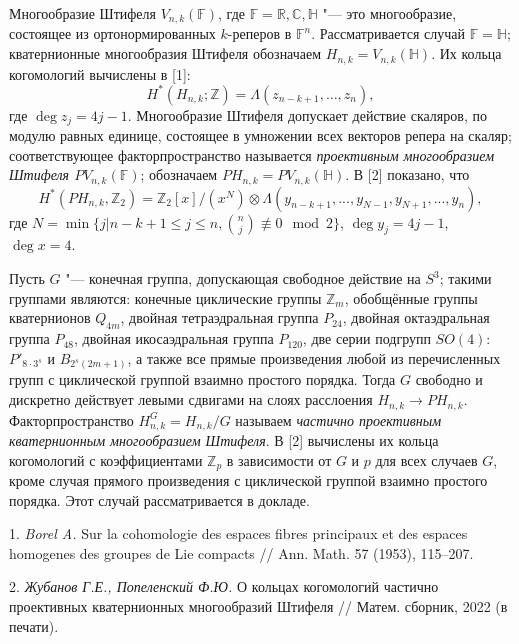 
\vzmscaption

Многообразие Штифеля $V_{n,k}(\mathbb{F})$, где $\mathbb{F} = \mathbb{R}, \mathbb{C}, \mathbb{H}$ "--- это многообразие, состоящее из ортонормированных $k$-реперов в $\mathbb{F}^n$. Рассматривается случай $\mathbb{F} = \mathbb{H}$; кватернионные многообразия Штифеля обозначаем $H_{n,k} = V_{n,k}(\mathbb{H})$. Их кольца когомологий вычислены в [1]:
$$H^*(H_{n,k}; \mathbb{Z}) = \Lambda(z_{n-k+1}, \ldots, z_n),$$
где $\deg z_j = 4j - 1$. Многообразие Штифеля допускает действие скаляров, по модулю равных единице, состоящее в умножении всех векторов репера на скаляр; соответствующее факторпространство называется \emph{проективным многообразием Штифеля $PV_{n,k}(\mathbb{F})$}; обозначаем $PH_{n,k}=PV_{n,k}(\mathbb{H})$. В [2] показано, что
$$H^*(PH_{n,k}, \mathbb{Z}_2) = \mathbb{Z}_2[x]/(x^N) \otimes \Lambda(y_{n-k+1},..., y_{N-1}, y_{N+1}, ..., y_n),$$
где $N = \min \{j | n - k + 1 \leqslant j \leqslant n, \binom{n}{j} \not\equiv 0 \mod 2\}$, $\deg y_j = 4j - 1$, $\deg x = 4$.

Пусть $G$ "--- конечная группа, допускающая свободное действие на $S^3$; такими группами являются: конечные циклические группы $\mathbb{Z}_m$, обобщённые группы кватернионов $Q_{4m}$, двойная тетраэдральная группа $P_{24}$, двойная октаэдральная группа $P_{48}$, двойная икосаэдральная группа $P_{120}$, две серии подгрупп $SO(4)$: $P'_{8\cdot3^s}$ и $B_{2^s(2m+1)}$, а также все прямые произведения любой из перечисленных групп с циклической группой взаимно простого порядка. Тогда $G$ свободно и дискретно действует левыми сдвигами на слоях расслоения $H_{n,k} \to PH_{n,k}$. Факторпространство $H^G_{n,k} = H_{n,k}/G$ называем \emph{частично проективным кватернионным многообразием Штифеля}. В [2] вычислены их кольца когомологий с коэффициентами $\mathbb{Z}_p$ в зависимости от $G$ и $p$ для всех случаев $G$, кроме случая прямого произведения с циклической группой взаимно простого порядка. Этот случай рассматривается в докладе.


\litlist

1. \emph{Borel A.} Sur la cohomologie des espaces fibres principaux et des espaces homogenes
des groupes de Lie compacts // Ann. Math. 57 (1953), 115–207.

2. \emph{Жубанов Г.Е., Попеленский Ф.Ю.} О кольцах когомологий частично проективных кватернионных многообразий Штифеля // Матем. сборник, 2022 (в печати).
